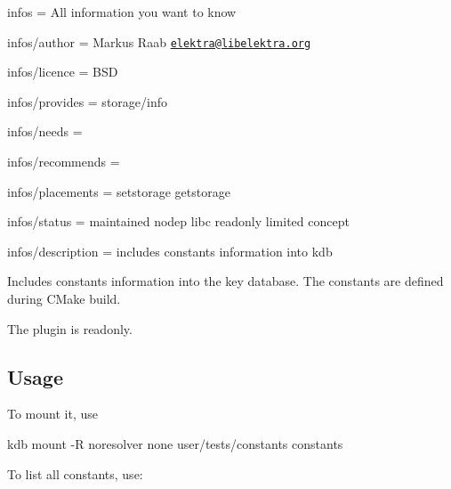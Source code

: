 
\begin{DoxyItemize}
\item infos = All information you want to know
\item infos/author = Markus Raab \href{mailto:elektra@libelektra.org}{\tt elektra@libelektra.\+org}
\item infos/licence = B\+SD
\item infos/provides = storage/info
\item infos/needs =
\item infos/recommends =
\item infos/placements = setstorage getstorage
\item infos/status = maintained nodep libc readonly limited concept
\item infos/description = includes constants information into kdb
\end{DoxyItemize}

Includes constants information into the key database. The constants are defined during C\+Make build.

The plugin is readonly.

\subsection*{Usage}

To mount it, use


\begin{DoxyCode}
kdb mount -R noresolver none user/tests/constants constants
\end{DoxyCode}


To list all constants, use\+:


